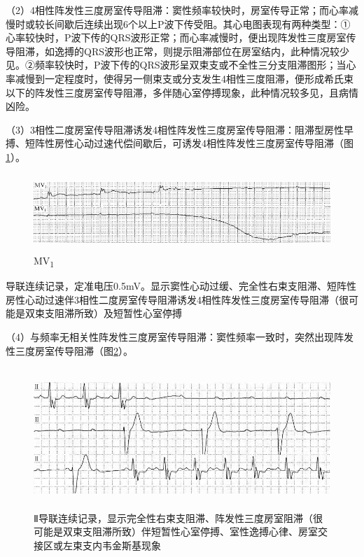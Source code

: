（2）4相性阵发性三度房室传导阻滞：窦性频率较快时，房室传导正常；而心率减慢时或较长间歇后连续出现6个以上P波下传受阻。其心电图表现有两种类型：①心率较快时，P波下传的QRS波形正常；而心率减慢时，便出现阵发性三度房室传导阻滞，如逸搏的QRS波形也正常，则提示阻滞部位在房室结内，此种情况较少见。②频率较快时，P波下传的QRS波形呈双束支或不全性三分支阻滞图形；当心率减慢到一定程度时，使得另一侧束支或分支发生4相性三度阻滞，便形成希氏束以下的阵发性三度房室传导阻滞，多伴随心室停搏现象，此种情况较多见，且病情凶险。

（3）3相性二度房室传导阻滞诱发4相性阵发性三度房室传导阻滞：阻滞型房性早搏、短阵性房性心动过速代偿间歇后，可诱发4相性阵发性三度房室传导阻滞（图\ref{fig22-16}）。

\begin{figure}[!htbp]
 \centering
 \includegraphics[width=5.58333in,height=1.14583in]{./images/Image00383.jpg}
 \captionsetup{justification=centering}
 \caption{MV\textsubscript{1}}
 \label{fig22-16}
  \end{figure} 
导联连续记录，定准电压0.5mV。显示窦性心动过缓、完全性右束支阻滞、短阵性房性心动过速伴3相性二度房室传导阻滞诱发4相性阵发性三度房室传导阻滞（很可能是双束支阻滞所致）及短暂性心室停搏

（4）与频率无相关性阵发性三度房室传导阻滞：窦性频率一致时，突然出现阵发性三度房室传导阻滞（图\ref{fig22-17}）。

\begin{figure}[!htbp]
 \centering
 \includegraphics[width=5.58333in,height=2.09375in]{./images/Image00384.jpg}
 \captionsetup{justification=centering}
 \caption{Ⅱ导联连续记录，显示完全性右束支阻滞、阵发性三度房室阻滞（很可能是双束支阻滞所致）伴短暂性心室停搏、室性逸搏心律、房室交接区或左束支内韦金斯基现象}
 \label{fig22-17}
  \end{figure} 

